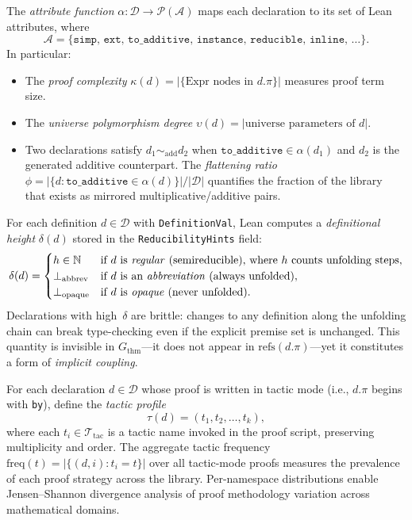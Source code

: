 \begin{definition}\label{def:decl-attributes}
The \emph{attribute function} $\alpha : \mathcal{D} \to \mathcal{P}(\mathcal{A})$ maps each declaration to its set of Lean attributes, where
\[
  \mathcal{A} = \{\texttt{simp},\, \texttt{ext},\, \texttt{to\_additive},\, \texttt{instance},\, \texttt{reducible},\, \texttt{inline},\, \ldots\}.
\]
In particular:
\begin{itemize}
  \item The \emph{proof complexity} $\kappa(d) = |\{\text{Expr nodes in } d.\pi\}|$ measures proof term size.
  \item The \emph{universe polymorphism degree} $\upsilon(d) = |\text{universe parameters of } d|$.
  \item Two declarations satisfy $d_1 \sim_{\mathrm{add}} d_2$ when $\texttt{to\_additive} \in \alpha(d_1)$ and $d_2$ is the generated additive counterpart. The \emph{flattening ratio} $\phi = |\{d : \texttt{to\_additive} \in \alpha(d)\}| / |\mathcal{D}|$ quantifies the fraction of the library that exists as mirrored multiplicative/additive pairs.
\end{itemize}
\end{definition}

\begin{definition}\label{def:def-height}
For each definition $d \in \mathcal{D}$ with \texttt{DefinitionVal}, Lean computes a \emph{definitional height} $\delta(d)$ stored in the \texttt{ReducibilityHints} field:
\[
  \delta(d) =
  \begin{cases}
    h \in \mathbb{N} & \text{if } d \text{ is \emph{regular} (semireducible), where } h \text{ counts unfolding steps},\\
    \bot_{\mathrm{abbrev}} & \text{if } d \text{ is an \emph{abbreviation} (always unfolded)},\\
    \bot_{\mathrm{opaque}} & \text{if } d \text{ is \emph{opaque} (never unfolded)}.
  \end{cases}
\]
Declarations with high~$\delta$ are brittle: changes to any definition along the unfolding chain can break type-checking even if the explicit premise set is unchanged. This quantity is invisible in $G_{\mathrm{thm}}$---it does not appear in $\mathrm{refs}(d.\pi)$---yet it constitutes a form of \emph{implicit coupling}.
\end{definition}

\begin{definition}\label{def:tactic-usage}
For each declaration $d \in \mathcal{D}$ whose proof is written in tactic mode (i.e., $d.\pi$ begins with \texttt{by}), define the \emph{tactic profile}
\[
  \tau(d) = (t_1, t_2, \ldots, t_k),
\]
where each $t_i \in \mathcal{T}_{\mathrm{tac}}$ is a tactic name invoked in the proof script, preserving multiplicity and order. The aggregate tactic frequency $\mathrm{freq}(t) = |\{(d, i) : t_i = t\}|$ over all tactic-mode proofs measures the prevalence of each proof strategy across the library. Per-namespace distributions enable Jensen--Shannon divergence analysis of proof methodology variation across mathematical domains.
\end{definition}

